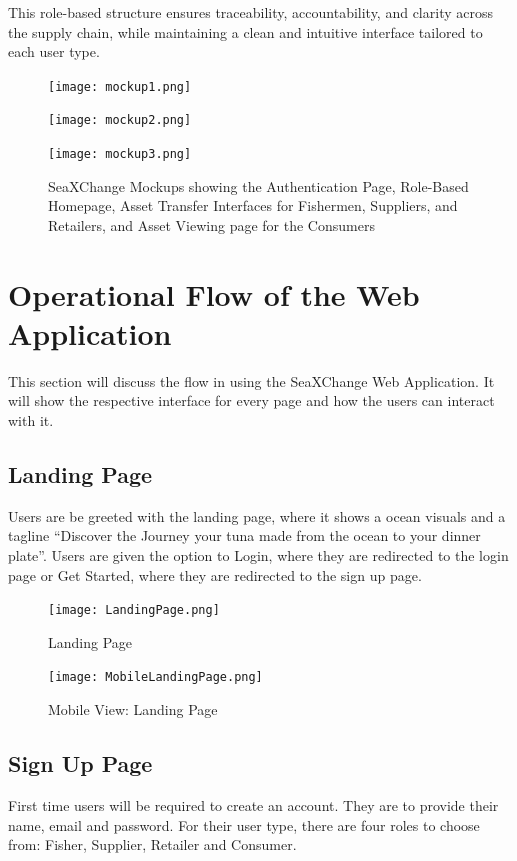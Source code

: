 This role-based structure ensures traceability, accountability, and clarity across the supply chain, while maintaining a clean and intuitive interface tailored to each user type.
\begin{figure}[H]
	\centering
	\texttt{[image: mockup1.png]}
	
	\vspace{20pt} %
	
	\texttt{[image: mockup2.png]}
\end{figure}

\clearpage %


\begin{figure}[H]
	\centering
	\texttt{[image: mockup3.png]}
	\caption{SeaXChange Mockups showing the Authentication Page, Role-Based Homepage, Asset Transfer Interfaces for Fishermen, Suppliers, and Retailers, and Asset Viewing page for the Consumers}
	\label{fig:eight_step}
\end{figure}


\section{Operational Flow of the Web Application}
This section will discuss the flow in using the SeaXChange Web Application. It will show the respective interface for every page and how the users can interact with it. 

\subsection{Landing Page}
Users are be greeted with the landing page, where it shows a ocean visuals and a tagline “Discover the Journey your tuna made from the ocean to your dinner plate”. Users are given the option to Login, where they are redirected to the login page or Get Started, where they are redirected to the sign up page. 

\begin{figure}[H]
	\centering
	\texttt{[image: LandingPage.png]}
	\caption{Landing Page}
	\label{fig:landing_page}
\end{figure}

\begin{figure}[H]
	\centering
	\texttt{[image: MobileLandingPage.png]}
	\caption{Mobile View: Landing Page}
	\label{fig:mobile_landing_page}
\end{figure}	

\subsection{Sign Up Page}
First time users will be required to create an account. They are to provide their name, email and password. For their user type, there are four roles to choose from: Fisher, Supplier, Retailer and Consumer. 

